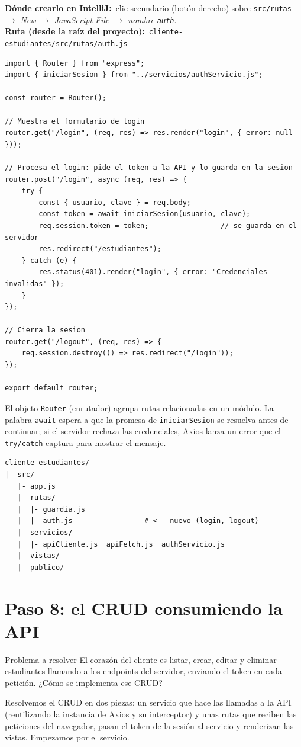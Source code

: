 \documentclass[11pt]{article}
\newcommand{\dondecrear}[3]{\begin{ubic}{\footnotesize\textbf{\color{ndverdeo}D\'onde crearlo en IntelliJ:}~clic secundario (bot\'on derecho) sobre \texttt{#1} $\rightarrow$ \emph{New} $\rightarrow$ \emph{#2}.\\[2pt]\textbf{\color{ndverdeo}Ruta (desde la ra\'iz del proyecto):}~\texttt{#3}}\end{ubic}\nobreak\vspace{3pt}}
\begin{document}
\dondecrear{src/rutas}{JavaScript File $\rightarrow$ nombre \texttt{auth}}{cliente-estudiantes/src/rutas/auth.js}
\begin{cajacodigo}
\begin{lstlisting}[style=js]
import { Router } from "express";
import { iniciarSesion } from "../servicios/authServicio.js";

const router = Router();

// Muestra el formulario de login
router.get("/login", (req, res) => res.render("login", { error: null }));

// Procesa el login: pide el token a la API y lo guarda en la sesion
router.post("/login", async (req, res) => {
	try {
		const { usuario, clave } = req.body;
		const token = await iniciarSesion(usuario, clave);
		req.session.token = token;                 // se guarda en el servidor
		res.redirect("/estudiantes");
	} catch (e) {
		res.status(401).render("login", { error: "Credenciales invalidas" });
	}
});

// Cierra la sesion
router.get("/logout", (req, res) => {
	req.session.destroy(() => res.redirect("/login"));
});

export default router;
\end{lstlisting}
\end{cajacodigo}
\vspace{2pt}
El objeto \texttt{Router} (enrutador) agrupa rutas relacionadas en un módulo. La palabra \texttt{await} espera a que la promesa de \texttt{iniciar\allowbreak{}Sesion} se resuelva antes de continuar; si el servidor rechaza las credenciales, Axios lanza un error que el \texttt{try/catch} captura para mostrar el mensaje.

\begin{cajacodigo}
\begin{lstlisting}[style=markup]
cliente-estudiantes/
|- src/
   |- app.js
   |- rutas/
   |  |- guardia.js
   |  |- auth.js                 # <-- nuevo (login, logout)
   |- servicios/
   |  |- apiCliente.js  apiFetch.js  authServicio.js
   |- vistas/
   |- publico/
\end{lstlisting}
\end{cajacodigo}
\vspace{2pt}

\section{Paso 8: el CRUD consumiendo la API}
\begin{cajaproblema}{Problema a resolver}
El corazón del cliente es listar, crear, editar y eliminar estudiantes llamando a los endpoints del servidor, enviando el token en cada petición. ¿Cómo se implementa ese CRUD?\par
\end{cajaproblema}
Resolvemos el CRUD en dos piezas: un servicio que hace las llamadas a la API (reutilizando la instancia de Axios y su interceptor) y unas rutas que reciben las peticiones del navegador, pasan el token de la sesión al servicio y renderizan las vistas. Empezamos por el servicio.
\end{document}
